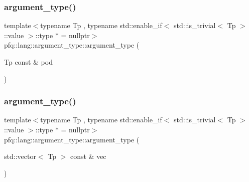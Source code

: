 \mbox{\label{structpfq_1_1lang_1_1argument__type_a1ed803face97c18de5b24a852174f160}} 
\subsubsection{\texorpdfstring{argument\+\_\+type()}{argument\_type()}\hspace{0.1cm}{\footnotesize\ttfamily [3/10]}}
{\footnotesize\ttfamily template$<$typename Tp , typename std\+::enable\+\_\+if$<$ std\+::is\+\_\+trivial$<$ Tp $>$\+::value $>$\+::type $\ast$  = nullptr$>$ \\
pfq\+::lang\+::argument\+\_\+type\+::argument\+\_\+type (\begin{DoxyParamCaption}\item[{Tp const \&}]{pod }\end{DoxyParamCaption})\hspace{0.3cm}{\ttfamily [inline]}}

\mbox{\label{structpfq_1_1lang_1_1argument__type_a214fc2f5dc718677454cde46788cef1d}} 
\subsubsection{\texorpdfstring{argument\+\_\+type()}{argument\_type()}\hspace{0.1cm}{\footnotesize\ttfamily [4/10]}}
{\footnotesize\ttfamily template$<$typename Tp , typename std\+::enable\+\_\+if$<$ std\+::is\+\_\+trivial$<$ Tp $>$\+::value $>$\+::type $\ast$  = nullptr$>$ \\
pfq\+::lang\+::argument\+\_\+type\+::argument\+\_\+type (\begin{DoxyParamCaption}\item[{std\+::vector$<$ Tp $>$ const \&}]{vec }\end{DoxyParamCaption})\hspace{0.3cm}{\ttfamily [inline]}}

